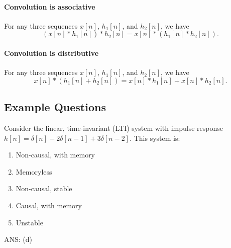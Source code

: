 \paragraph{Convolution is associative} For any three sequences $x[n]$, $h_1[n]$, and $h_2[n]$, we have
\[
    (x[n] * h_1[n]) * h_2[n] = x[n] * (h_1[n] * h_2[n]).
\]

\paragraph{Convolution is distributive} For any three sequences $x[n]$, $h_1[n]$, and $h_2[n]$, we have
\[
    x[n] * (h_1[n] + h_2[n]) = x[n] * h_1[n] + x[n] * h_2[n].
\]


\subsection{Example Questions}
\begin{q}{}
Consider the linear, time-invariant (LTI) system with impulse response $h[n] = \delta[n] - 2\delta[n-1] + 3\delta[n-2]$. This system is:
\begin{enumerate}[label=(\alph*)]
    \item Non-causal, with memory
    \item Memoryless
    \item Non-causal, stable
    \item Causal, with memory
    \item Unstable
\end{enumerate}

\begin{flushright}
\begin{blueenv}
    ANS: (d)
\end{blueenv}
\end{flushright}
\end{q}

